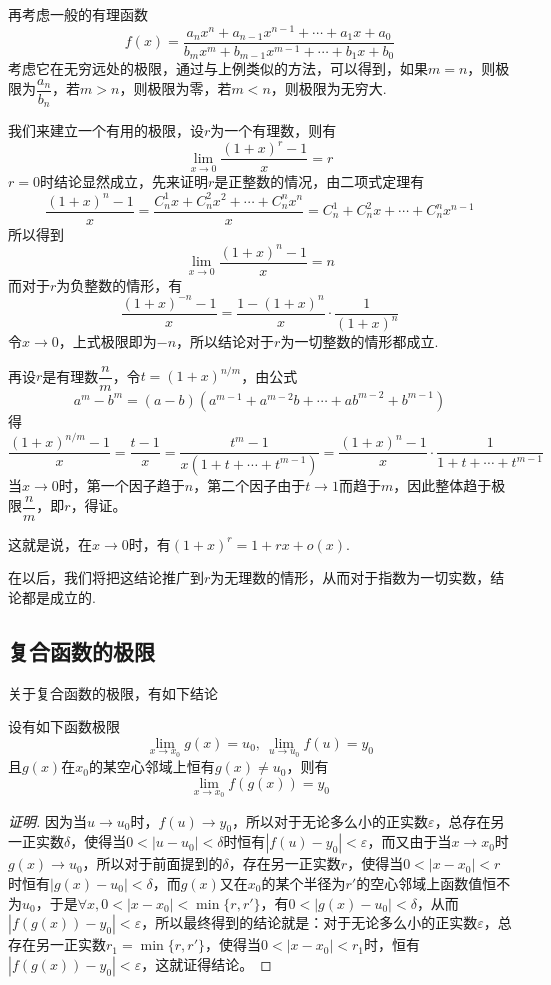 \begin{example}
  \label{example:limit-of-fraction-function}
  再考虑一般的有理函数
  \[ f(x) = \frac{a_nx^n+a_{n-1}x^{n-1}+\cdots+a_1x+a_0}{b_mx^m+b_{m-1}x^{m-1}+\cdots+b_1x+b_0} \]
考虑它在无穷远处的极限，通过与上例类似的方法，可以得到，如果$m=n$，则极限为$\dfrac{a_n}{b_n}$，若$m>n$，则极限为零，若$m<n$，则极限为无穷大.
\end{example}

\begin{example}
  我们来建立一个有用的极限，设$r$为一个有理数，则有
  \[ \lim_{x \to 0} \frac{(1+x)^r-1}{x} = r \]
  $r=0$时结论显然成立，先来证明$r$是正整数的情况，由二项式定理有
  \[ \frac{(1+x)^n-1}{x} = \frac{C_n^1x+C_n^2x^2+\cdots+C_n^nx^n}{x} = C_n^1+C_n^2x+\cdots+C_n^nx^{n-1} \]
  所以得到
  \[ \lim_{x \to 0} \frac{(1+x)^n-1}{x} = n \]
  而对于$r$为负整数的情形，有
  \[ \frac{(1+x)^{-n}-1}{x} = \frac{1-(1+x)^n}{x} \cdot \frac{1}{(1+x)^n} \]
  令$x \to 0$，上式极限即为$-n$，所以结论对于$r$为一切整数的情形都成立.

  再设$r$是有理数$\dfrac{n}{m}$，令$t=(1+x)^{n/m}$，由公式
  \[ a^m-b^m=(a-b)(a^{m-1}+a^{m-2}b+\cdots+ab^{m-2}+b^{m-1}) \]
  得
  \[ \frac{(1+x)^{n/m}-1}{x} = \frac{t-1}{x} = \frac{t^m-1}{x(1+t+\cdots+t^{m-1})} = \frac{(1+x)^n-1}{x} \cdot \frac{1}{1+t+\cdots+t^{m-1}} \]
  当$x \to 0$时，第一个因子趋于$n$，第二个因子由于$t \to 1$而趋于$m$，因此整体趋于极限$\dfrac{n}{m}$，即$r$，得证。

  这就是说，在$x \to 0$时，有$(1+x)^r=1+rx+o(x)$.

  在以后，我们将把这结论推广到$r$为无理数的情形，从而对于指数为一切实数，结论都是成立的.
\end{example}

\subsection{复合函数的极限}
\label{sec:limit-of-composite-function}

关于复合函数的极限，有如下结论
\begin{theorem}
  \label{theorem:limit-of-combine-function}
  设有如下函数极限
  \[ \lim_{x \to x_0}g(x) = u_0, \  \lim_{u \to u_0}f(u) = y_0 \]
  且$g(x)$在$x_0$的某空心邻域上恒有$g(x) \neq u_0$，则有
  \[ \lim_{x \to x_0} f(g(x))=y_0 \]
\end{theorem}

\begin{proof}[证明]
  因为当$u \to u_0$时，$f(u) \to y_0$，所以对于无论多么小的正实数$\varepsilon$，总存在另一正实数$\delta$，使得当$0<|u-u_0|<\delta$时恒有$|f(u)-y_0|<\varepsilon$，而又由于当$x \to x_0$时$g(x) \to u_0$，所以对于前面提到的$\delta$，存在另一正实数$r$，使得当$0<|x-x_0|<r$时恒有$|g(x)-u_0|<\delta$，而$g(x)$又在$x_0$的某个半径为$r'$的空心邻域上函数值恒不为$u_0$，于是$\forall x,0<|x-x_0|<\min\{r,r'\}$，有$0<|g(x)-u_0|<\delta$，从而$|f(g(x))-y_0|<\varepsilon$，所以最终得到的结论就是：对于无论多么小的正实数$\varepsilon$，总存在另一正实数$r_1=\min\{r,r'\}$，使得当$0<|x-x_0|<r_1$时，恒有$|f(g(x))-y_0|<\varepsilon$，这就证得结论。
\end{proof}

